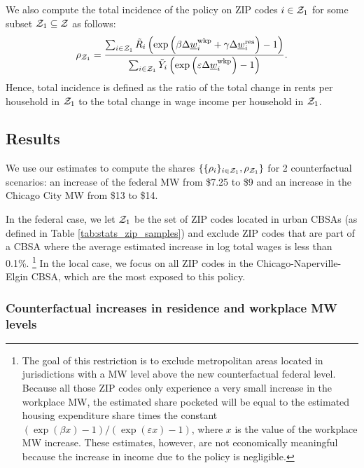 We also compute the total incidence of the policy on ZIP codes $i\in\mathcal{Z}_1$
for some subset $\mathcal{Z}_1\subseteq\mathcal{Z}$ as follows:
\begin{equation*}\label{eq:tot_incidence}
    \rho_{\mathcal{Z}_1} = 
        \frac{\sum_{i\in\mathcal{Z}_1} \tilde R_i \left(\exp \left( \beta \Delta \underline{w}_i^{\text{wkp}} 
                                    + \gamma \Delta \underline{w}_i^{\text{res}} \right) - 1\right) }
            {\sum_{i\in\mathcal{Z}_1} \tilde Y_i \left( \exp \left( \varepsilon \Delta \underline{w}_i^{\text{wkp}} \right) 
                                    - 1\right) } .
\end{equation*}
Hence, total incidence is defined as the ratio of the total change in rents
per household in $\mathcal{Z}_1$ to the total change in wage income per household 
in $\mathcal{Z}_1$.

\subsection{Results}\label{sec:results_cf}

We use our estimates to compute the shares 
$\{\{\rho_i\}_{i\in\mathcal{Z}_1},\rho_{\mathcal{Z}_1}\}$ for 2 counterfactual scenarios:
an increase of the federal MW from \$7.25 to \$9 and 
an increase in the Chicago City MW from \$13 to \$14.

In the federal case, we let $\mathcal{Z}_1$ be the set of ZIP codes located in urban 
CBSAs (as defined in Table \ref{tab:stats_zip_samples}) and exclude ZIP codes 
that are part of a CBSA where the average estimated increase in log total wages 
is less than 0.1\%.%
\footnote{\label{foot:restriction_on_zipcodes}
The goal of this restriction is to exclude metropolitan areas located 
in jurisdictions with a MW level above the new counterfactual federal level.
Because all those ZIP codes only experience a very small increase in the 
workplace MW, the estimated share pocketed will be equal to the estimated
housing expenditure share times the constant 
$\left(\exp(\beta x)-1\right)/\left(\exp(\varepsilon x)-1\right)$,
where $x$ is the value of the workplace MW increase.
These estimates, however, are not economically meaningful because the increase
in income due to the policy is negligible.}
In the local case, we focus on all ZIP codes in the Chicago-Naperville-Elgin CBSA,
which are the most exposed to this policy.

\subsubsection{Counterfactual increases in residence and workplace MW levels}
\label{sec:cf_res_and_wkp_changes}

